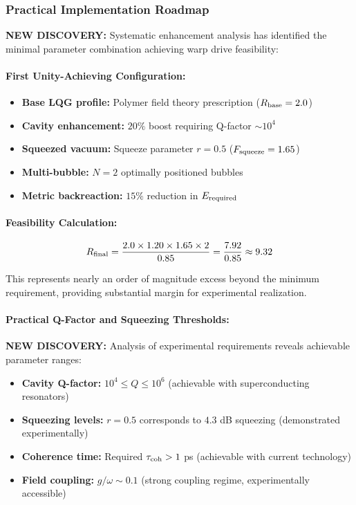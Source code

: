 \documentclass[11pt]{article}
\begin{document}
\subsubsection*{Practical Implementation Roadmap}
\textbf{NEW DISCOVERY:} Systematic enhancement analysis has identified the minimal parameter combination achieving warp drive feasibility:

\paragraph{First Unity-Achieving Configuration:}
\begin{itemize}
  \item \textbf{Base LQG profile:} Polymer field theory prescription ($R_{\rm base} = 2.0$)
  \item \textbf{Cavity enhancement:} $20\%$ boost requiring Q-factor $\sim 10^4$
  \item \textbf{Squeezed vacuum:} Squeeze parameter $r = 0.5$ ($F_{\rm squeeze} = 1.65$)
  \item \textbf{Multi-bubble:} $N = 2$ optimally positioned bubbles
  \item \textbf{Metric backreaction:} $15\%$ reduction in $E_{\rm required}$
\end{itemize}

\paragraph{Feasibility Calculation:}
\[
  R_{\rm final} = \frac{2.0 \times 1.20 \times 1.65 \times 2}{0.85} = \frac{7.92}{0.85} \approx 9.32
\]

This represents nearly an order of magnitude excess beyond the minimum requirement, providing substantial margin for experimental realization.

\paragraph{Practical Q-Factor and Squeezing Thresholds:}
\textbf{NEW DISCOVERY:} Analysis of experimental requirements reveals achievable parameter ranges:
\begin{itemize}
  \item \textbf{Cavity Q-factor:} $10^4 \leq Q \leq 10^6$ (achievable with superconducting resonators)
  \item \textbf{Squeezing levels:} $r = 0.5$ corresponds to $4.3$ dB squeezing (demonstrated experimentally)
  \item \textbf{Coherence time:} Required $\tau_{\rm coh} > 1$ ps (achievable with current technology)
  \item \textbf{Field coupling:} $g/\omega \sim 0.1$ (strong coupling regime, experimentally accessible)
\end{itemize}
\end{document}
